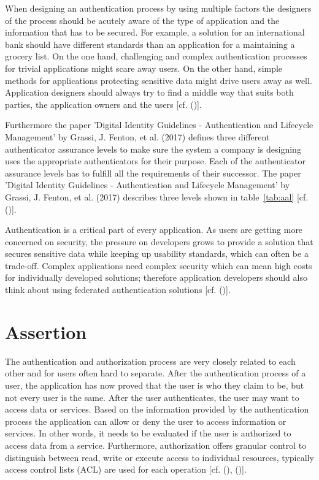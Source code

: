 \pagebreak[4]
When designing an authentication process by using multiple factors the designers of the process should be acutely aware of the type of application and the information that has to be secured. For example, a solution for an international bank should have different standards than an application for a maintaining a grocery list. On the one hand, challenging and complex authentication processes for trivial applications might scare away users. On the other hand, simple methods for applications protecting sensitive data might drive users away as well. Application designers should always try to find a middle way that suits both parties, the application owners and the users [cf. (\cite{NIST:2017:DIG})]. 


Furthermore the paper 'Digital Identity Guidelines - Authentication and Lifecycle Management' by Grassi, J. Fenton, et al. (2017) defines three different authenticator assurance levels to make sure the system a company is designing uses the appropriate authenticators for their purpose. Each of the authenticator assurance levels has to fulfill all the requirements of their successor. The paper 'Digital Identity Guidelines - Authentication and Lifecycle Management' by  Grassi, J. Fenton, et al. (2017) describes three levels shown in table~\ref{tab:aal} [cf. (\cite{NIST:2017:DIGAL})].

Authentication is a critical part of every application. As users are getting more concerned on security, the pressure on developers grows to provide a solution that secures sensitive data while keeping up usability standards, which can often be a trade-off. Complex applications need complex security which can mean high costs for individually developed solutions; therefore application developers should also think about using federated authentication solutions [cf. (\cite{NIST:2017:DIGAL})].


\section{Assertion}
\label{assertion}
The authentication and authorization process are very closely related to each other and for users often hard to separate. After the authentication process of a user, the application has now proved that the user is who they claim to be, but not every user is the same. After the user authenticates, the user may want to access data or services. Based on the information provided by the authentication process the application can allow or deny the user to access information or services. In other words, it needs to be evaluated if the user is authorized to access data from a service. Furthermore, authorization offers granular control to distinguish between read, write or execute access to individual resources, typically access control lists (ACL) are used for each operation [cf. (\cite{Todorov:2007:MUI}), (\cite{Boyed:2012:GSOA})].

